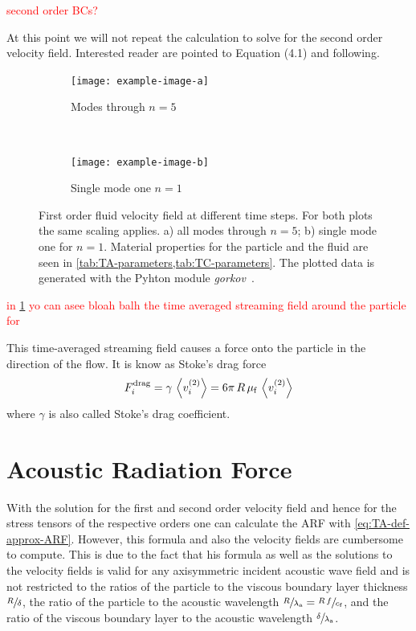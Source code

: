 \textcolor{red}{second order BCs?}

At this point we will not repeat the calculation to solve for the second order 
velocity field. Interested reader are pointed to  
Equation (4.1) and following.

\begin{figure}
  \centering
  \begin{subfigure}[b]{\textwidth}
    \centering
    \caption{Modes through $n=5$}
    \texttt{[image: example-image-a]}
  \end{subfigure}\\%
  \begin{subfigure}[b]{\textwidth}
    \centering
    \caption{Single mode one $n=1$}
    \texttt{[image: example-image-b]}
  \end{subfigure}
  \caption{First order fluid velocity field at different time steps. For both 
  plots the same scaling applies. a) all modes through $n=5$; b) single mode 
one for $n=1$. Material properties for the particle and the fluid are seen in 
\cref{tab:TA-parameters,tab:TC-parameters}. The plotted data is generated with 
the Pyhton module \emph{gorkov}~\cite{FankhauserPython2022}.}
  \label{fig:TA-AS}
\end{figure}

\textcolor{red}{in \cref{fig:TA-AS} yo can asee bloah balh the time averaged 
streaming field around the particle for}

This time-averaged streaming field causes a force onto the particle in the 
direction of the flow. It is know as Stoke's drag force
\begin{equation}
  F^{\mathrm{drag}}_{i} = \gamma\,\left\langle v_{i}^{(2)} \right\rangle = 
  6\pi\,R\,\mu_{\mathrm{f}}\,\left\langle v_{i}^{(2)} \right\rangle
  \label{eq:TA-drag-force}
\end{equation}
where $\gamma$ is also called Stoke's drag coefficient.


\section{Acoustic Radiation Force\label{sec:TA-ARF}}

With the solution for the first and second order velocity field and hence for 
the stress tensors of the respective orders one can calculate the ARF with 
\cref{eq:TA-def-approx-ARF}. However, this formula and also the velocity fields 
are cumbersome to compute. This is due to the fact that his formula as well as 
the solutions to the velocity fields is valid for any axisymmetric incident 
acoustic wave field and is not restricted to the ratios of the particle to the 
viscous boundary layer thickness $\sfrac{R}{\delta}$, the ratio of the particle 
to the acoustic wavelength $\sfrac{R}{\lambda_{\mathrm{a}}} = 
\sfrac{R\,f}{c_{\mathrm{f}}}$, and the ratio of the viscous boundary layer to the 
acoustic wavelength $\sfrac{\delta}{\lambda_{\mathrm{a}}}$.

